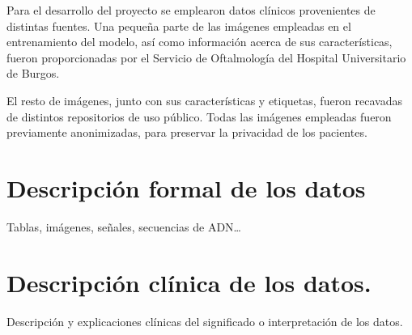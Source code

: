 
Para el desarrollo del proyecto se emplearon datos clínicos provenientes de distintas fuentes. Una pequeña parte de las imágenes empleadas en el entrenamiento del modelo, así como información acerca de sus características, fueron proporcionadas por el Servicio de Oftalmología del Hospital Universitario de Burgos.

El resto de imágenes, junto con sus características y etiquetas, fueron recavadas de distintos repositorios de uso público. Todas las imágenes empleadas fueron previamente anonimizadas, para preservar la privacidad de los pacientes.

\section{Descripción formal de los datos}

Tablas, imágenes, señales, secuencias de ADN…
    
\section{Descripción clínica de los datos.}

Descripción y explicaciones clínicas del significado o interpretación de los datos.